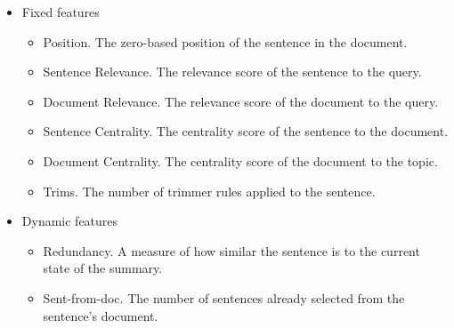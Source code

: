 \documentclass[xcolor={table}]{beamer}
\begin{document}
\begin{frame}[t]{\cite{zajic2006sentence}}

\begin{itemize}
\small
 \item Fixed features
  \begin{itemize}
\small
   \item  Position. The zero-based position of the
        sentence in the document.
   \item Sentence Relevance. The relevance
        score of the sentence to the query.
   \item Document Relevance. The relevance
        score of the document to the query.
   \item Sentence Centrality. The centrality
        score of the sentence to the document.
   \item Document Centrality. The centrality
    score of the document to the topic.
   \item Trims. The number of trimmer rules applied
    to the sentence.
  \end{itemize}  
 \item Dynamic features
  \begin{itemize}
\small
   \item Redundancy. A measure of how similar
     the sentence is to the current state of the
     summary.
   \item Sent-from-doc. The number of sentences
        already selected from the sentence's
        document.
  \end{itemize}
 \end{itemize}
\end{frame}
\end{document}

